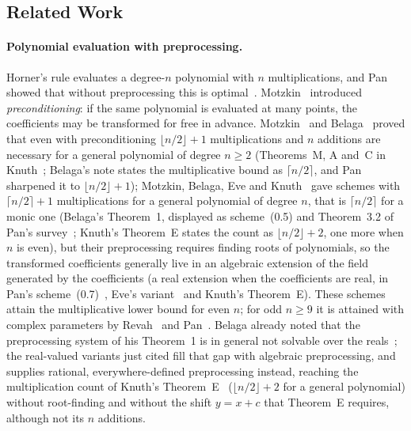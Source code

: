 \subsection{Related Work}
\label{sec:related}

\paragraph{Polynomial evaluation with preprocessing.}
Horner's rule evaluates a degree-$n$ polynomial with $n$ multiplications, and Pan showed that without preprocessing this is optimal~\cite{pan1966methods}.
Motzkin~\cite{motzkin1955evaluation} introduced \emph{preconditioning}: if the same polynomial is evaluated at many points, the coefficients may be transformed for free in advance.
Motzkin~\cite{motzkin1955evaluation} and Belaga~\cite{belaga1958some,belaga1961evaluation} proved that even with preconditioning $\lfloor n/2\rfloor+1$ multiplications and $n$ additions are necessary for a general polynomial of degree $n\ge2$ (Theorems~M, A and~C in Knuth~\cite[\S4.6.4]{knuth1997seminumerical}; Belaga's note states the multiplicative bound as $\lceil n/2\rceil$, and Pan~\cite{pan1966methods} sharpened it to $\lfloor n/2\rfloor+1$);
Motzkin, Belaga, Eve and Knuth~\cite{motzkin1955evaluation,belaga1958some,eve1964evaluation,knuth1962evaluation} gave schemes with $\lceil n/2\rceil+1$ multiplications for a general polynomial of degree $n$, that is $\lceil n/2\rceil$ for a monic one (Belaga's Theorem~1, displayed as scheme~(0.5) and Theorem~3.2 of Pan's survey~\cite{pan1966methods}; Knuth's Theorem~E states the count as $\lfloor n/2\rfloor+2$, one more when $n$ is even), but their preprocessing requires finding roots of polynomials, so the transformed coefficients generally live in an algebraic extension of the field generated by the coefficients (a real extension when the coefficients are real, in Pan's scheme~(0.7)~\cite{pan1966methods}, Eve's variant~\cite{eve1964evaluation} and Knuth's Theorem~E).
These schemes attain the multiplicative lower bound for even $n$; for odd $n\ge9$ it is attained with complex parameters by Revah~\cite{revah1975number} and Pan~\cite{pan1978complex}.
Belaga already noted that the preprocessing system of his Theorem~1 is in general not solvable over the reals~\cite{belaga1958some}; the real-valued variants just cited fill that gap with algebraic preprocessing, and  supplies rational, everywhere-defined preprocessing instead, reaching the multiplication count of Knuth's Theorem~E~\cite{knuth1962evaluation,knuth1997seminumerical} ($\lfloor n/2\rfloor+2$ for a general polynomial) without root-finding and without the shift $y=x+c$ that Theorem~E requires, although not its $n$ additions.
